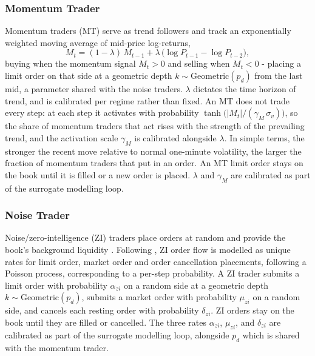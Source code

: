 \subsubsection{Momentum Trader}

Momentum traders (MT) serve as trend followers and track an exponentially weighted moving
average of mid-price log-returns,
\begin{equation}
  M_t = (1-\lambda)\,M_{t-1} + \lambda\,\big(\log P_{t-1} - \log P_{t-2}\big),
\end{equation}
buying when the momentum signal $M_t > 0$ and selling when $M_t < 0$ - placing a limit order on that side at a geometric depth $k \sim \mathrm{Geometric}(p_d)$ from the last mid, a parameter shared with the noise traders. $\lambda$ dictates the time horizon of trend, and is calibrated per regime rather than
fixed. An MT does not trade every step: at each step it activates with probability
$\tanh\!\big(|M_t| / (\gamma_M\,\sigma_v)\big)$, so the share of momentum traders
that act rises with the strength of the prevailing trend, and the activation scale
$\gamma_M$ is calibrated alongside $\lambda$. In simple terms, the stronger the recent move relative to normal one-minute volatility, the larger the fraction of momentum traders that put in an order. An MT limit order stays on the book until it is filled or a new order is placed. $\lambda$ and $\gamma_M$ are calibrated as part of the surrogate modelling loop.



\subsubsection{Noise Trader}

Noise/zero-intelligence (ZI) traders place orders at random and provide the book's
background liquidity \citep{farmer_2005}. Following \cite{cont_stoikov_talreja_2008}, ZI order flow is modelled as unique rates for limit order, market order and order cancellation placements, following a Poisson process, corresponding to a per-step probability. A ZI trader submits a limit order with probability $\alpha_{zi}$ on a random side at a geometric
depth $k \sim \mathrm{Geometric}(p_d)$, submits a market order with probability $\mu_{zi}$ on a
random side, and cancels each resting order with probability $\delta_{zi}$. ZI orders stay on the book until they are filled or cancelled. The three rates $\alpha_{zi}$,
$\mu_{zi}$, and $\delta_{zi}$ are calibrated as part of the surrogate modelling loop, alongside $p_d$ which is shared with the momentum trader. 

